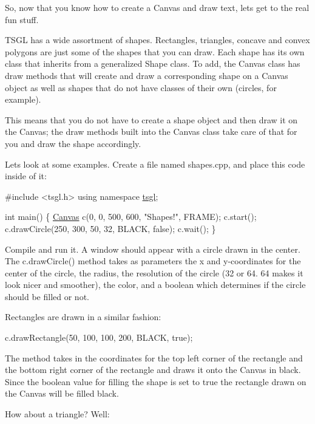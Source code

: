 So, now that you know how to create a Canvas and draw text, let\textquotesingle{}s get to the real fun stuff.

T\+S\+G\+L has a wide assortment of shapes. Rectangles, triangles, concave and convex polygons are just some of the shapes that you can draw. Each shape has its own class that inherits from a generalized Shape class. To add, the Canvas class has draw methods that will create and draw a corresponding shape on a Canvas object as well as shapes that do not have classes of their own (circles, for example).

This means that you do not have to create a shape object and then draw it on the Canvas; the draw methods built into the Canvas class take care of that for you and draw the shape accordingly.

Let\textquotesingle{}s look at some examples. Create a file named shapes.\+cpp, and place this code inside of it\+:


\begin{DoxyCode}
\textcolor{preprocessor}{#include <tsgl.h>}
\textcolor{keyword}{using namespace }\hyperlink{namespacetsgl}{tsgl};

\textcolor{keywordtype}{int} main() \{
  \hyperlink{classtsgl_1_1_canvas}{Canvas} c(0, 0, 500, 600, \textcolor{stringliteral}{"Shapes!"}, FRAME);
  c.start();
  c.drawCircle(250, 300, 50, 32, BLACK, \textcolor{keyword}{false});
  c.wait();
\}
\end{DoxyCode}


Compile and run it. A window should appear with a circle drawn in the center. The c.\+draw\+Circle() method takes as parameters the x and y-\/coordinates for the center of the circle, the radius, the resolution of the circle (32 or 64. 64 makes it look nicer and smoother), the color, and a boolean which determines if the circle should be filled or not.

Rectangles are drawn in a similar fashion\+:


\begin{DoxyCode}
c.drawRectangle(50, 100, 100, 200, BLACK, \textcolor{keyword}{true});
\end{DoxyCode}


The method takes in the coordinates for the top left corner of the rectangle and the bottom right corner of the rectangle and draws it onto the Canvas in black. Since the boolean value for filling the shape is set to {\ttfamily true} the rectangle drawn on the Canvas will be filled black.

How about a triangle? Well\+:


